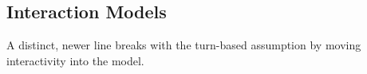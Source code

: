 \documentclass{llmxive}
\begin{document}


\subsection{Interaction Models}
A distinct, newer line breaks with the turn-based assumption by moving interactivity into the model.
\end{document}
